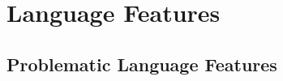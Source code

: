 \chapter{Language Features}
\label{language_features}

  \section{Problematic Language Features}
  \label{language_features:problematic_language_features}